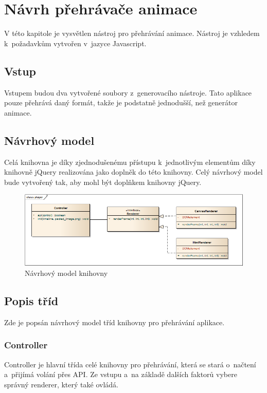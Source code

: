 \chapter{Návrh přehrávače animace}
\label{section:playerdraft}

V této kapitole je vysvětlen nástroj pro přehrávání animace. Nástroj je vzhledem k~požadavkům vytvořen v~jazyce Javascript.

\section{Vstup}

Vstupem budou dva vytvořené soubory z~generovacího nástroje. Tato aplikace pouze přehrává daný formát, takže je podstatně jednodušší, než generátor animace. 

\section{Návrhový model}

Celá knihovna je díky zjednodušenému přístupu k~jednotlivým elementům  díky knihovně jQuery realizována jako doplněk do této knihovny. Celý návrhový model bude vytvořený tak, aby mohl být doplňkem knihovny jQuery\cite{jqueryplugin}. 


\begin{figure}[h]
\centering
\includegraphics[width=1\textwidth]{figures/player.png}
\caption{Návrhový model knihovny}
\label{fig:player}
\end{figure}


\section{Popis tříd}

Zde je popsán návrhový model tříd knihovny pro přehrávání aplikace. 

\subsection{Controller}
Controller je hlavní třída celé knihovny pro přehrávání, která se stará o~načtení a~přijímá volání přes API. Ze vstupu a~na základě dalších faktorů vybere  správný renderer, který také ovládá. 

